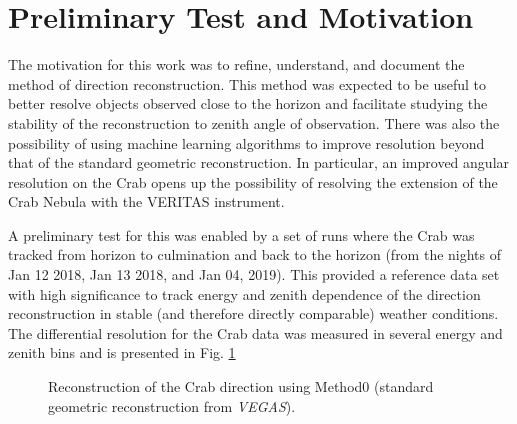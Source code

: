 \documentclass[main.tex]{subfiles}
\begin{document}
\section{Preliminary Test and Motivation}
The motivation for this work was to refine, understand, and document the \disp method of direction reconstruction. This method was expected to be useful to better resolve objects observed close to the horizon and facilitate studying the stability of the reconstruction to zenith angle of observation. There was also the possibility of using machine learning algorithms to improve resolution beyond that of the standard geometric reconstruction. In particular, an improved angular resolution on the Crab opens up the possibility of resolving the extension of the Crab Nebula with the VERITAS instrument.

A preliminary test for this was enabled by a set of runs where the Crab was tracked from horizon to culmination and back to the horizon (from the nights of Jan 12 2018, Jan 13 2018, and Jan 04, 2019). This provided a reference data set with high significance to track energy and zenith dependence of the direction reconstruction in stable (and therefore directly comparable) weather conditions. The differential resolution for the Crab data was measured in several energy and zenith bins and is presented in Fig. \ref{fig:crab_initial}

\begin{figure}[H]
  \begin{center}
  \end{center}
  \caption[Crab direction reconstruction using Method0.]{Reconstruction of the Crab direction using Method0 (standard geometric reconstruction from \textit{VEGAS}).}
  \label{fig:crab_initial}
\end{figure}

\end{document}
